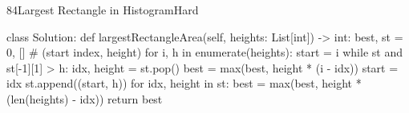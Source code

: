 \begin{problem}{84}{Largest Rectangle in Histogram}{Hard}
\begin{code}
class Solution:
    def largestRectangleArea(self, heights: List[int]) -> int:
        best, st = 0, []  # (start index, height)
        for i, h in enumerate(heights):
            start = i
            while st and st[-1][1] > h:
                idx, height = st.pop()
                best = max(best, height * (i - idx))
                start = idx
            st.append((start, h))
        for idx, height in st:
            best = max(best, height * (len(heights) - idx))
        return best
\end{code}
\end{problem}
